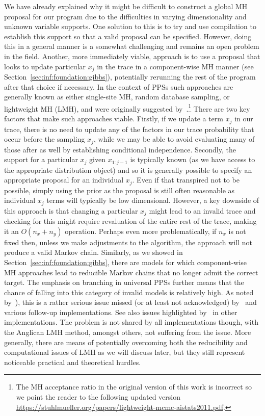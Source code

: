 We have already explained why it might be difficult to construct a global MH proposal for
our program due to the difficulties in varying dimensionality and unknown variable supports.
One solution to this is to try and use compilation to establish this support so that
a valid proposal can be specified.  However, doing this in a general manner is a somewhat
challenging and remains an open problem in the field.  Another, more immediately viable,
approach is to use a proposal that looks to update particular $x_j$ in the trace in a
component-wise MH manner (see Section~\ref{sec:inf:foundation:gibbs}), potentially rerunning
the rest of the program after that choice if necessary.  In the context of PPSs such
approaches are generally known as either single-site MH, random database sampling, or lightweight MH (LMH), and were
originally suggested by~\citep{wingate2011lightweight}.\footnote{The MH acceptance ratio in the original version of this work
	is incorrect so we point the reader to the following updated version
	\url{https://stuhlmueller.org/papers/lightweight-mcmc-aistats2011.pdf}.} There are two key factors
that make such approaches viable.  Firstly, if we update a term $x_j$ in our trace, there is
no need to update any of the factors in our trace probability that occur before the sampling
$x_j$, while we may be able to avoid evaluating many of those after as well by establishing
conditional independence.  Secondly, the support for a particular $x_j$ given
$x_{1:j-1}$ is typically known (as 
we have access to the appropriate distribution object) and so it is generally possible to specify
an appropriate proposal for an individual $x_j$.  Even if that transpired not to be possible, 
simply using the prior as the proposal is still often reasonable as individual $x_j$ terms will typically
be low dimensional.  However, a key downside of this approach is that changing a particular $x_j$
might lead to an invalid trace and checking for this might require revaluation of the entire rest of the
trace, making it an $O(n_x+n_y)$ operation.  Perhaps even more problematically, if $n_x$ is not fixed
then, unless we make adjustments to the algorithm, the approach will not produce a 
valid Markov chain.  Similarly, as we showed in Section~\ref{sec:inf:foundation:gibbs},
there are models for which component-wise MH approaches lead to reducible Markov chains
that no longer admit the correct target.  The emphasis on branching in universal PPSs further
means that the chance of falling into this category of invalid models is relatively high.  As
noted by~\citep{kiselyov2016problems}), this is a rather serious issue missed (or at least not
acknowledged) by~\cite{wingate2011lightweight} and various follow-up implementations.
See also issues highlighted by~\citep{hur2015provably} in other implementations.
The problem is not shared by all implementations though, with the Anglican LMH method, amongst
others, not suffering from the issue.
More generally, there are means of potentially overcoming both the reducibility and computational
issues of LMH as we will discuss later, but
they still represent noticeable practical and theoretical hurdles.

